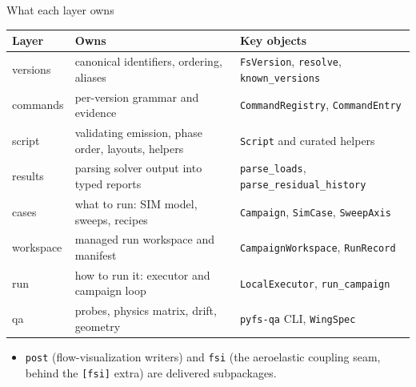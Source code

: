 \documentclass[aspectratio=169,10pt]{beamer}
\newcommand{\code}[1]{\texttt{\small #1}}
\begin{document}
\begin{frame}{What each layer owns}
  \scriptsize
  \begin{tabular}{@{}lp{5.2cm}p{4.6cm}@{}}
    \toprule
    Layer & Owns & Key objects \\
    \midrule
    versions & canonical identifiers, ordering, aliases & \code{FsVersion}, \code{resolve}, \code{known\_versions} \\
    commands & per-version grammar and evidence & \code{CommandRegistry}, \code{CommandEntry} \\
    script & validating emission, phase order, layouts, helpers & \code{Script} and curated helpers \\
    results & parsing solver output into typed reports & \code{parse\_loads}, \code{parse\_residual\_history} \\
    cases & what to run: SIM model, sweeps, recipes & \code{Campaign}, \code{SimCase}, \code{SweepAxis} \\
    workspace & managed run workspace and manifest & \code{CampaignWorkspace}, \code{RunRecord} \\
    run & how to run it: executor and campaign loop & \code{LocalExecutor}, \code{run\_campaign} \\
    qa & probes, physics matrix, drift, geometry & \code{pyfs-qa} CLI, \code{WingSpec} \\
    \bottomrule
  \end{tabular}
  \vspace{2mm}
  \begin{itemize}
    \item \code{post} (flow-visualization writers) and \code{fsi} (the aeroelastic coupling seam, behind the \code{[fsi]} extra) are delivered subpackages.
  \end{itemize}
\end{frame}
\end{document}
